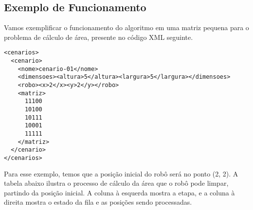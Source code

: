 \subsection{Exemplo de Funcionamento}

Vamos exemplificar o funcionamento do algoritmo em uma matriz pequena para o problema de cálculo de área, presente no código XML seguinte.
\newpage
\begin{lstlisting}
<cenarios>
  <cenario>
    <nome>cenario-01</nome>
    <dimensoes><altura>5</altura><largura>5</largura></dimensoes>
    <robo><x>2</x><y>2</y></robo>
    <matriz>
      11100
      10100
      10111
      10001
      11111
    </matriz>
  </cenario>
</cenarios>
\end{lstlisting}

Para esse exemplo, temos que a posição inicial do robô será no ponto (2, 2). A tabela abaixo ilustra o processo de cálculo da área que o robô pode limpar, partindo da posição inicial. A coluna à esquerda mostra a etapa, e a coluna à direita mostra o estado da fila e as posições sendo processadas.

